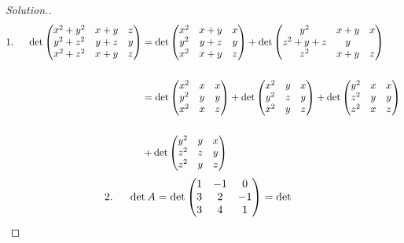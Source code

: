 \documentclass[11pt,a4paper]{article}
\theoremstyle{definition}
\newenvironment{solution}
  {\renewcommand{\qedsymbol}{}\begin{proof}[\textit{Solution}.]}
  {\end{proof}}
\begin{document}
\begin{solution}
\begin{align*}
1.\hspace{0.5cm} \det 
\begin{pmatrix}
x^2+y^2&x+y&z\\y^2+z^2&y+z&y\\x^2+z^2&x+y&z\\
\end{pmatrix}
&=\det
\begin{pmatrix}
x^2&x+y&x\\y^2&y+z&y\\x^2&x+y&z
\end{pmatrix}
+\det
\begin{pmatrix}
y^2&x+y&x\\z^2+y+z&y\\z^2&x+y&z\\
\end{pmatrix}\\\\
&=\det
\begin{pmatrix}
x^2&x&x\\y^2&y&y\\x^2&x&z\\
\end{pmatrix}
+\det
\begin{pmatrix}
x^2&y&x\\y^2&z&y\\x^2&y&z\\
\end{pmatrix}
+\det
\begin{pmatrix}
y^2&x&x\\z^2&y&y\\z^2&x&z\\
\end{pmatrix}\\\\
&
+\det
\begin{pmatrix}
y^2&y&x\\z^2&z&y\\z^2&y&z\\
\end{pmatrix}\\
\end{align*}
\begin{align*}
2.\hspace{0.5cm} \det A &=\det
\begin{pmatrix}
1&-1&0\\3&2&-1\\3&4&1\\
\end{pmatrix}=\det

\end{align*}
\end{solution}
\end{document}
